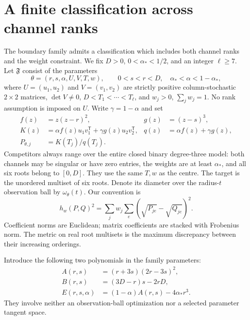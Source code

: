 \section{A finite classification across channel ranks}
\label{sec:family-v96}
The boundary family admits a classification which includes both channel
ranks and the weight constraint. We fix $D>0$, $0<\alpha_*<1/2$,
and an integer $\ell\ge7$. Let $\mathfrak F$ consist of the parameters
\[
 \theta=(r,s,\alpha,U,V,T,w),\qquad
 0<s<r<D,\quad \alpha_*<\alpha<1-\alpha_*,
\]
where $U=(u_1,u_2)$ and $V=(v_1,v_2)$ are strictly positive
column-stochastic $2\times2$ matrices, $\det V\ne0$,
$D<T_1<\cdots<T_\ell$, and $w_j>0$, $\sum_jw_j=1$.
No rank assumption is imposed on $U$. Write $\gamma=1-\alpha$ and set
\begin{align}
 f(z)&=z(z-r)^2,&g(z)&=(z-s)^3,\nonumber\\
 K(z)&=\alpha f(z)u_1v_1^{\mathsf T}
           +\gamma g(z)u_2v_2^{\mathsf T},&
 q(z)&=\alpha f(z)+\gamma g(z),\label{eq:family-model-v96}\\
 P_{\theta,j}&=K(T_j)/q(T_j).&&\nonumber
\end{align}
Competitors always range over the entire closed binary degree-three
model: both channels may be singular or have zero entries, the weights
are at least $\alpha_*$, and all six roots belong to $[0,D]$.
They use the same $T,w$ as the centre. The target is the unordered
multiset of six roots. Denote its diameter over the radius-$t$
observation ball by $\omega_\theta(t)$. Our convention is
\[
 h_w(P,Q)^2=\sum_j w_j\sum_e(\sqrt{P_{je}}-\sqrt{Q_{je}})^2.
\]
Coefficient norms are Euclidean; matrix coefficients are stacked with
Frobenius norm. The metric on real root multisets is the maximum
discrepancy between their increasing orderings.

Introduce the following two polynomials in the family parameters:
\begin{align}
 A(r,s)&=(r+3s)(2r-3s)^2,\nonumber\\
 B(r,s)&=(3D-r)s-2rD,\nonumber\\
 E(r,s,\alpha)&=(1-\alpha)A(r,s)-4\alpha_*r^3.\label{eq:phase-polynomials-v96}
\end{align}
They involve neither an observation-ball optimization nor a selected
parameter tangent space.

